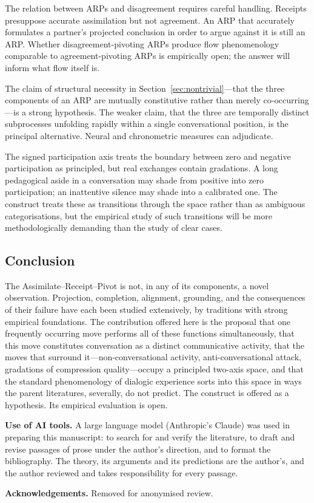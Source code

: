 The relation between ARPs and disagreement requires careful handling. Receipts presuppose accurate assimilation but not agreement. An ARP that accurately formulates a partner's projected conclusion in order to argue against it is still an ARP. Whether disagreement-pivoting ARPs produce flow phenomenology comparable to agreement-pivoting ARPs is empirically open; the answer will inform what flow itself is.

The claim of structural necessity in Section~\ref{sec:nontrivial}---that the three components of an ARP are mutually constitutive rather than merely co-occurring---is a strong hypothesis. The weaker claim, that the three are temporally distinct subprocesses unfolding rapidly within a single conversational position, is the principal alternative. Neural and chronometric measures can adjudicate.

The signed participation axis treats the boundary between zero and negative participation as principled, but real exchanges contain gradations. A long pedagogical aside in a conversation may shade from positive into zero participation; an inattentive silence may shade into a calibrated one. The construct treats these as transitions through the space rather than as ambiguous categorisations, but the empirical study of such transitions will be more methodologically demanding than the study of clear cases.

\subsection{Conclusion}

The Assimilate--Receipt--Pivot is not, in any of its components, a novel observation. Projection, completion, alignment, grounding, and the consequences of their failure have each been studied extensively, by traditions with strong empirical foundations. The contribution offered here is the proposal that one frequently occurring move performs all of these functions simultaneously, that this move constitutes conversation as a distinct communicative activity, that the moves that surround it---non-conversational activity, anti-conversational attack, gradations of compression quality---occupy a principled two-axis space, and that the standard phenomenology of dialogic experience sorts into this space in ways the parent literatures, severally, do not predict. The construct is offered as a hypothesis. Its empirical evaluation is open.

\medskip
\noindent\textbf{Use of AI tools.} A large language model (Anthropic's Claude) was used in preparing this manuscript: to search for and verify the literature, to draft and revise passages of prose under the author's direction, and to format the bibliography. The theory, its arguments and its predictions are the author's, and the author reviewed and takes responsibility for every passage.

\noindent\textbf{Acknowledgements.} Removed for anonymised review.




